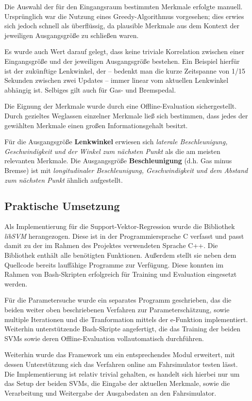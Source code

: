 Die Auswahl der für den Eingangsraum bestimmten Merkmale erfolgte manuell. Ursprünglich war die Nutzung eines Greedy-Algorithmus vorgesehen; dies erwies sich jedoch schnell als überflüssig, da plausible Merkmale aus dem Kontext der jeweiligen Ausgangsgröße zu schließen waren.

Es wurde auch Wert darauf gelegt, dass keine triviale Korrelation zwischen einer Eingangsgröße und der jeweiligen Ausgangsgröße bestehen. Ein Beispiel hierfür ist der zukünftige Lenkwinkel, der – bedenkt man die kurze Zeitspanne von 1/15 Sekunden zwischen zwei Updates – immer linear vom aktuellen Lenkwinkel abhängig ist. Selbiges gilt auch für Gas- und Bremspedal.

Die Eignung der Merkmale wurde durch eine Offline-Evaluation sichergestellt. Durch gezieltes Weglassen einzelner Merkmale ließ sich bestimmen, dass jedes der gewählten Merkmale einen großen Informationsgehalt besitzt.

Für die Ausgangsgröße \textbf{Lenkwinkel} erwiesen sich \textit{laterale Beschleunigung, Geschwindigkeit und der Winkel zum nächsten Punkt} als die am meisten relevanten Merkmale. Die Ausgangsgröße \textbf{Beschleunigung} (d.h. Gas minus Bremse) ist mit \textit{longitudinaler Beschleunigung, Geschwindigkeit und dem Abstand zum nächsten Punkt} ähnlich aufgestellt.

\subsection{Praktische Umsetzung}
\label{subsec:PraktischeUmsetzung}
Als Implementierung für die Support-Vektor-Regression wurde die Bibliothek \textit{libSVM} herangezogen. Diese ist in der Programmiersprache C verfasst und passt damit zu der im Rahmen des Projektes verwendeten Sprache C++. Die Bibliothek enthält alle benötigten Funktionen. Außerdem stellt sie neben dem Quellcode bereits lauffähige Programme zur Verfügung. Diese konnten im Rahmen von Bash-Skripten erfolgreich für Training und Evaluation eingesetzt werden.

Für die Parametersuche wurde ein separates Programm geschrieben, das die beiden weiter oben beschriebenen Verfahren zur Parameterschätzung, sowie multiple Iterationen und die Tranformation mittels der e-Funktion implementiert. Weiterhin unterstützende Bash-Skripte angefertigt, die das Training der beiden SVMs sowie deren Offline-Evaluation vollautomatisch durchführen.

Weiterhin wurde das Framework um ein entsprechendes Modul erweitert, mit dessen Unterstützung sich das Verfahren online am Fahrsimulator testen lässt. Die Implementierung ist relativ trivial gehalten, es handelt sich hierbei nur um das Setup der beiden SVMs, die Eingabe der aktuellen Merkmale, sowie die Verarbeitung und Weitergabe der Ausgabedaten an den Fahrsimulator.

